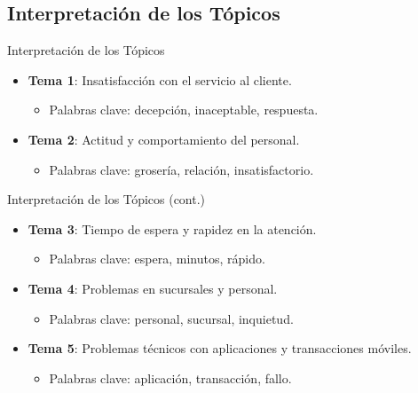 \documentclass[aspectratio=169, xcolor={dvipsnames}, 10pt, spanish]{beamer}
\begin{document}
\subsection{Interpretación de los Tópicos}
\begin{frame}{Interpretación de los Tópicos}
    \begin{itemize}
        \item \textbf{Tema 1}: Insatisfacción con el servicio al cliente.
        \begin{itemize}
            \item Palabras clave: decepción, inaceptable, respuesta.
        \end{itemize}
        \item \textbf{Tema 2}: Actitud y comportamiento del personal.
        \begin{itemize}
            \item Palabras clave: grosería, relación, insatisfactorio.
        \end{itemize}
    \end{itemize}
\end{frame}

\begin{frame}{Interpretación de los Tópicos (cont.)}
    \begin{itemize}
        \item \textbf{Tema 3}: Tiempo de espera y rapidez en la atención.
        \begin{itemize}
            \item Palabras clave: espera, minutos, rápido.
        \end{itemize}
        \item \textbf{Tema 4}: Problemas en sucursales y personal.
        \begin{itemize}
            \item Palabras clave: personal, sucursal, inquietud.
        \end{itemize}
        \item \textbf{Tema 5}: Problemas técnicos con aplicaciones y transacciones móviles.
        \begin{itemize}
            \item Palabras clave: aplicación, transacción, fallo.
        \end{itemize}
    \end{itemize}
\end{frame}
\end{document}

